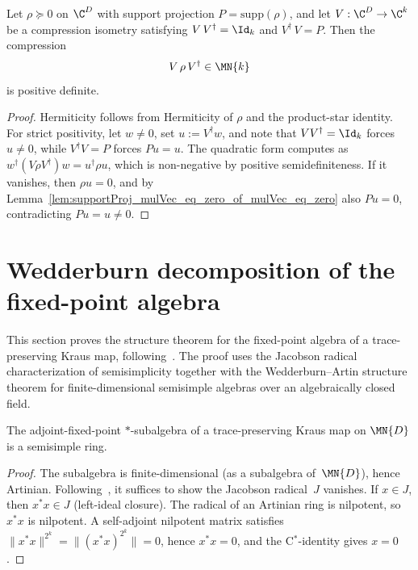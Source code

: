 \begin{theorem}%
    \label{thm:compression_on_support_posDef}
    \leanok
    Let $\rho \succeq 0$ on $\C^D$ with support projection
    $P = \mathrm{supp}(\rho)$, and let
    $V : \C^D \to \C^k$ be a compression isometry satisfying
    $V\,V^\dagger = \Id_k$ and $V^\dagger\,V = P$. Then the compression
    \[
        V\,\rho\,V^\dagger \in \MN{k}
    \]
    is positive definite.
\end{theorem}
\begin{proof}\leanok
    Hermiticity follows from Hermiticity of $\rho$ and the product-star
    identity. For strict positivity, let $w \neq 0$, set
    $u := V^\dagger w$, and note that $V V^\dagger = \Id_k$ forces
    $u \neq 0$, while $V^\dagger V = P$ forces $P u = u$. The quadratic
    form computes as
    $w^\dagger (V\rho V^\dagger) w = u^\dagger \rho u$,
    which is non-negative by positive semidefiniteness. If it vanishes, then
    $\rho u = 0$, and by
    Lemma~\ref{lem:supportProj_mulVec_eq_zero_of_mulVec_eq_zero} also
    $P u = 0$, contradicting $P u = u \neq 0$.
\end{proof}

\section{Wedderburn decomposition of the fixed-point algebra}

This section proves the structure theorem for the fixed-point
algebra of a trace-preserving Kraus map, following~\cite[Theorems~6.12--6.14]{Wolf2012Quantum}. The proof uses the
Jacobson radical characterization of semisimplicity together with the
Wedderburn--Artin structure theorem for finite-dimensional semisimple
algebras over an algebraically closed field.

\begin{theorem}%
    \label{thm:fixedPointAlgebra_isSemisimpleRing}
    \leanok
    The adjoint-fixed-point $*$-subalgebra of a trace-preserving
    Kraus map on $\MN{D}$ is a semisimple ring.
\end{theorem}

\begin{proof}
    \leanok
    The subalgebra is finite-dimensional (as a subalgebra of~$\MN{D}$),
    hence Artinian. Following~\cite[Theorem~6.14]{Wolf2012Quantum}, it
    suffices to show the Jacobson radical~$J$ vanishes. If $x \in J$, then
    $x^*x \in J$
    (left-ideal closure). The radical of an Artinian ring is nilpotent,
    so $x^*x$ is nilpotent. A self-adjoint nilpotent matrix satisfies
    $\lVert x^*x\rVert^{2^k} = \lVert (x^*x)^{2^k}\rVert = 0$,
    hence $x^*x = 0$, and the C$^*$-identity gives $x = 0$.
\end{proof}

